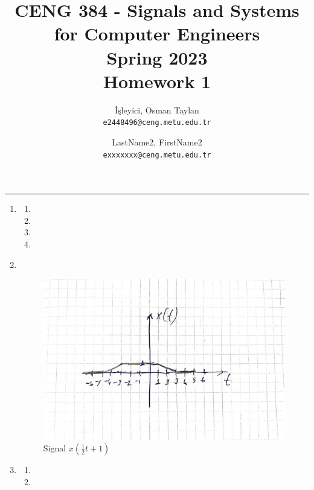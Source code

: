 \documentclass[10pt,a4paper, margin=1in]{article}
\author{
  İşleyici, Osman Taylan\\
  \texttt{e2448496@ceng.metu.edu.tr}
  \and
  LastName2, FirstName2\\
  \texttt{exxxxxxx@ceng.metu.edu.tr}
}
\title{CENG 384 - Signals and Systems for Computer Engineers \\
Spring 2023 \\
Homework 1}
\begin{document}
\maketitle



\noindent\rule{19cm}{1.2pt}

\begin{enumerate}

    \item %
          \begin{enumerate}
              \item %
              \item %
              \item %
              \item %
          \end{enumerate}

    \item ~\\
          \begin{figure}[H]
              \centering
              \includegraphics[scale=0.25]{handwritten_signal.jpeg}
              \caption{Signal $x(\frac{1}{2}t+1)$}
          \end{figure}

    \item %
          \begin{enumerate}
              \item %
              \item %
          \end{enumerate}


\end{enumerate}
\end{document}
